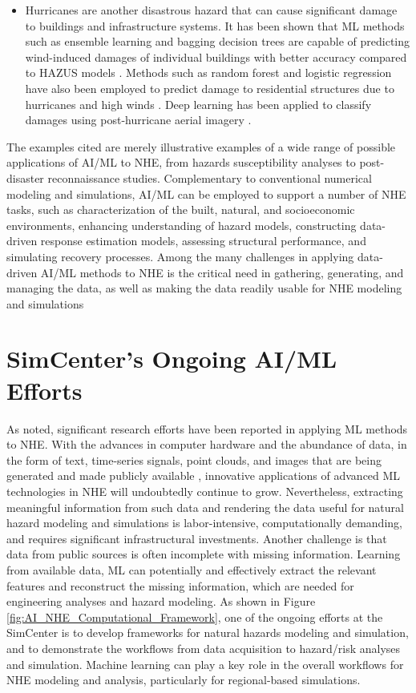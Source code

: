 \begin{itemize}
 \item Hurricanes are another disastrous hazard that can cause significant damage to buildings and infrastructure systems. It has been shown that ML methods such as ensemble learning and bagging decision trees are capable of predicting wind-induced damages of individual buildings with better accuracy compared to HAZUS models \citep{subramanian2013constructing}. Methods such as random forest and logistic regression have also been employed to predict damage to residential structures due to hurricanes and high winds \citep{salazar2015predicting}. Deep learning has been applied to classify damages using post-hurricane aerial imagery \citep{thomas2011robust, li2018semisupervised, kersbergen2018automated}. 
\end{itemize}

The examples cited are merely illustrative examples of a wide range of possible applications of AI/ML to NHE, from hazards susceptibility analyses to post-disaster reconnaissance studies. Complementary to conventional numerical modeling and simulations, AI/ML can be employed to support a number of NHE tasks, such as characterization of the built, natural, and socioeconomic environments, enhancing understanding of hazard models, constructing data-driven response estimation models, assessing structural performance, and simulating recovery processes. Among the many challenges in applying data-driven AI/ML methods to NHE is the critical need in gathering, generating, and managing the data, as well as making the data readily usable for NHE modeling and simulations \citep{padgett2020workshop}

\section{SimCenter's Ongoing AI/ML Efforts}
\label{sec:ai_simcenter}

As noted, significant research efforts have been reported in applying ML methods to NHE. With the advances in computer hardware and the abundance of data, in the form of text, time-series signals, point clouds, and images that are being generated and made publicly available \citep{rathje2017designsafe}, innovative applications of advanced ML technologies in NHE will undoubtedly continue to grow. Nevertheless, extracting meaningful information from such data and rendering the data useful for natural hazard modeling and simulations is labor-intensive, computationally demanding, and requires significant infrastructural investments. Another challenge is that data from public sources is often incomplete with missing information. Learning from available data, ML can potentially and effectively extract the relevant features and reconstruct the missing information, which are needed for engineering analyses and hazard modeling. As shown in Figure \ref{fig:AI_NHE_Computational_Framework}, one of the ongoing efforts at the SimCenter is to develop frameworks for natural hazards modeling and simulation, and to demonstrate the workflows from data acquisition to hazard/risk analyses and simulation. Machine learning can play a key role in the overall workflows for NHE modeling and analysis, particularly for regional-based simulations. 

